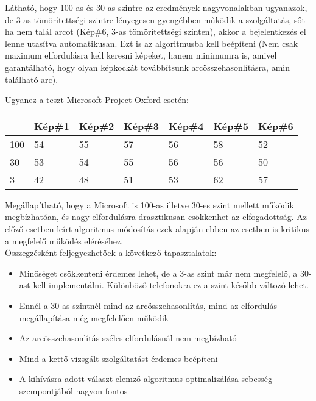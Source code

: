 Látható, hogy 100-as és 30-as szintre az eredmények nagyvonalakban ugyanazok, de 3-as tömörítettségi szintre lényegesen gyengébben működik a szolgáltatás, sőt ha nem talál arcot (Kép\#6, 3-as tömörítettségi szinten), akkor a bejelentkezés el lenne utasítva automatikusan. Ezt is az algoritmusba kell beépíteni (Nem csak maximum elfordulásra kell keresni képeket, hanem minimumra is, amivel garantálható, hogy olyan képkockát továbbítsunk arcösszehasonlításra, amin található arc).

Ugyanez a teszt Microsoft Project Oxford esetén:
\begin{center}
	\begin{tabular}{|p{2cm}|p{} |p{} | p{}|p{}|p{}|p{}|}
   	\hline
	 & Kép\#1 & Kép\#2& Kép\#3&Kép\#4 &Kép\#5 &Kép\#6\\ \hline
	100 & 54 & 55 &57 & 56 & 58 & 52 \\ \hline
	30 & 53 & 54 & 55 &56 & 56 & 50 \\ \hline
	3 & 42 & 48 & 51 & 53 & 62 & 57\\ \hline
	\end{tabular}
\end{center}

Megállapítható, hogy a Microsoft is 100-as illetve 30-es szint mellett működik megbízhatóan, és nagy elfordulásra drasztikusan csökkenhet az elfogadottság. Az előző esetben leírt algoritmus módosítás ezek alapján ebben az esetben is kritikus a megfelelő működés eléréséhez.
\\Összegzésként feljegyezhetőek a következő tapasztalatok:
\begin{itemize}
\item Minőséget csökkenteni érdemes lehet, de a 3-as szint már nem megfelelő, a 30-ast kell implementálni. Különböző telefonokra ez a szint később változó lehet.
\item Ennél a 30-as szintnél mind az arcösszehasonlítás, mind az elfordulás megállapítása még megfelelően működik
\item Az arcösszehasonlítás széles elfordulásnál nem megbízható
\item Mind a kettő vizsgált szolgáltatást érdemes beépíteni
\item A kihívásra adott választ elemző algoritmus optimalizálása sebesség szempontjából nagyon fontos
\end{itemize}


